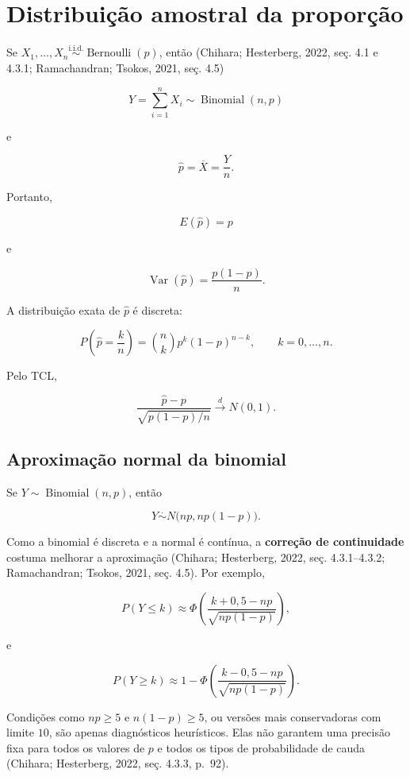 \documentclass[
  letterpaper,
  DIV=11,
  numbers=noendperiod]{scrreprt}
\begin{document}
\section{Distribuição amostral da
proporção}\label{distribuiuxe7uxe3o-amostral-da-proporuxe7uxe3o}

Se
\(X_1,\ldots,X_n\overset{\mathrm{i.i.d.}}{\sim}\operatorname{Bernoulli}(p)\),
então (Chihara; Hesterberg, 2022, seç. 4.1 e 4.3.1; Ramachandran;
Tsokos, 2021, seç. 4.5)

\[Y=\sum_{i=1}^nX_i\sim\operatorname{Binomial}(n,p)\]

e

\[\widehat p=\overline{X}=\frac{Y}{n}.\]

Portanto,

\[E(\widehat p)=p\]

e

\[\operatorname{Var}(\widehat p)=\frac{p(1-p)}{n}.\]

A distribuição exata de \(\widehat p\) é discreta:

\[P\left(\widehat p=\frac{k}{n}\right)
=
\binom{n}{k}p^k(1-p)^{n-k},
\qquad k=0,\ldots,n.\]

Pelo TCL,

\[\frac{\widehat p-p}{\sqrt{p(1-p)/n}}
\xrightarrow{d}N(0,1).\]

\subsection{Aproximação normal da
binomial}\label{aproximauxe7uxe3o-normal-da-binomial}

Se \(Y\sim\operatorname{Binomial}(n,p)\), então

\[Y\overset{\cdot}{\sim}N\bigl(np,np(1-p)\bigr).\]

Como a binomial é discreta e a normal é contínua, a \textbf{correção de
continuidade} costuma melhorar a aproximação (Chihara; Hesterberg, 2022,
seç. 4.3.1--4.3.2; Ramachandran; Tsokos, 2021, seç. 4.5). Por exemplo,

\[P(Y\leq k)
\approx
\Phi\left(
\frac{k+0{,}5-np}{\sqrt{np(1-p)}}
\right),\]

e

\[P(Y\geq k)
\approx
1-
\Phi\left(
\frac{k-0{,}5-np}{\sqrt{np(1-p)}}
\right).\]

\begin{tcolorbox}[enhanced jigsaw, colback=white, leftrule=.75mm, colbacktitle=quarto-callout-note-color!10!white, breakable, titlerule=0mm, bottomtitle=1mm, title=\textcolor{quarto-callout-note-color}{\faInfo}\hspace{0.5em}{Interpretação --- Condições práticas}, colframe=quarto-callout-note-color-frame, toprule=.15mm, opacityback=0, bottomrule=.15mm, opacitybacktitle=0.6, arc=.35mm, toptitle=1mm, rightrule=.15mm, coltitle=black, left=2mm]

Condições como \(np\geq5\) e \(n(1-p)\geq5\), ou versões mais
conservadoras com limite \(10\), são apenas diagnósticos heurísticos.
Elas não garantem uma precisão fixa para todos os valores de \(p\) e
todos os tipos de probabilidade de cauda (Chihara; Hesterberg, 2022,
seç. 4.3.3, p.~92).

\end{tcolorbox}
\end{document}
